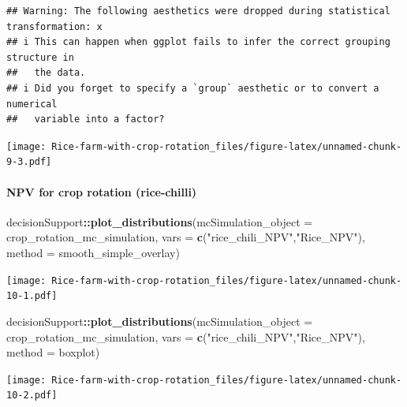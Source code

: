 \documentclass[
]{article}
\newenvironment{Shaded}{\begin{snugshade}}{\end{snugshade}}
\newcommand{\AttributeTok}[1]{\textcolor[rgb]{0.13,0.29,0.53}{#1}}
\newcommand{\FunctionTok}[1]{\textcolor[rgb]{0.13,0.29,0.53}{\textbf{#1}}}
\newcommand{\NormalTok}[1]{#1}
\newcommand{\SpecialCharTok}[1]{\textcolor[rgb]{0.81,0.36,0.00}{\textbf{#1}}}
\newcommand{\StringTok}[1]{\textcolor[rgb]{0.31,0.60,0.02}{#1}}
\begin{document}
\begin{verbatim}
## Warning: The following aesthetics were dropped during statistical transformation: x
## i This can happen when ggplot fails to infer the correct grouping structure in
##   the data.
## i Did you forget to specify a `group` aesthetic or to convert a numerical
##   variable into a factor?
\end{verbatim}

\texttt{[image: Rice-farm-with-crop-rotation\_files/figure-latex/unnamed-chunk-9-3.pdf]}

\hypertarget{npv-for-crop-rotation-rice-chilli}{%
\paragraph{NPV for crop rotation
(rice-chilli)}\label{npv-for-crop-rotation-rice-chilli}}

\begin{Shaded}
\begin{Highlighting}[]
\NormalTok{decisionSupport}\SpecialCharTok{::}\FunctionTok{plot\_distributions}\NormalTok{(}\AttributeTok{mcSimulation\_object =}\NormalTok{ crop\_rotation\_mc\_simulation, }
                                    \AttributeTok{vars =} \FunctionTok{c}\NormalTok{(}\StringTok{"rice\_chili\_NPV"}\NormalTok{,}\StringTok{"Rice\_NPV"}\NormalTok{),}
                                    \AttributeTok{method =} \StringTok{\textquotesingle{}smooth\_simple\_overlay\textquotesingle{}}\NormalTok{)}
\end{Highlighting}
\end{Shaded}

\texttt{[image: Rice-farm-with-crop-rotation\_files/figure-latex/unnamed-chunk-10-1.pdf]}

\begin{Shaded}
\begin{Highlighting}[]
\NormalTok{decisionSupport}\SpecialCharTok{::}\FunctionTok{plot\_distributions}\NormalTok{(}\AttributeTok{mcSimulation\_object =}\NormalTok{ crop\_rotation\_mc\_simulation, }
                                    \AttributeTok{vars =} \FunctionTok{c}\NormalTok{(}\StringTok{"rice\_chili\_NPV"}\NormalTok{,}\StringTok{"Rice\_NPV"}\NormalTok{),}
                                    \AttributeTok{method =} \StringTok{\textquotesingle{}boxplot\textquotesingle{}}\NormalTok{)}
\end{Highlighting}
\end{Shaded}

\texttt{[image: Rice-farm-with-crop-rotation\_files/figure-latex/unnamed-chunk-10-2.pdf]}
\end{document}
